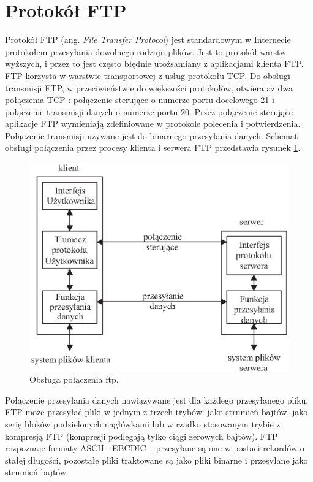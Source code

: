 \section{Protokół FTP}

Protokół FTP (ang. \emph{File Transfer Protocol}) jest standardowym w Internecie protokołem przesyłania dowolnego 
rodzaju plików. Jest to protokół warstw wyższych, i przez to jest często błędnie utożsamiany z aplikacjami 
klienta FTP. FTP korzysta w warstwie transportowej z usług protokołu TCP. Do obsługi transmisji FTP, w 
przeciwieństwie do większości protokołów, otwiera aż dwa połączenia TCP : połączenie sterujące o numerze portu 
docelowego 21 i połączenie transmisji danych o numerze portu 20. Przez połączenie sterujące aplikacje FTP 
wymieniają zdefiniowane w protokole polecenia i potwierdzenia. Połączenie transmisji używane jest do binarnego 
przesyłania danych. Schemat obsługi połączenia przez procesy klienta i serwera FTP przedstawia rysunek \ref{polaczenie_ftp}.
\begin{figure}[h]
\centering
\includegraphics[width=5in]{./rysunki/obsluga_ftp.eps}
\caption{Obsługa połączenia ftp.}
\label{polaczenie_ftp}
\end{figure}

Połączenie przesyłania danych nawiązywane jest dla każdego przesyłanego pliku. FTP może przesyłać pliki w 
jednym z trzech trybów: jako strumień bajtów, jako serię bloków podzielonych nagłówkami lub w rzadko stosowanym 
trybie z kompresją FTP (kompresji podlegają tylko ciągi zerowych bajtów). FTP rozpoznaje formaty ASCII i EBCDIC 
-- przesyłane są one w postaci rekordów o stałej długości, pozostałe pliki traktowane są jako pliki binarne i 
przesyłane jako strumień bajtów.


